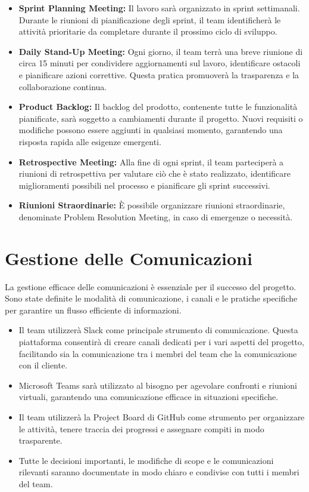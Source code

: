 \begin{itemize}
    \item \textbf{Sprint Planning Meeting:} Il lavoro sarà organizzato in sprint settimanali. Durante le riunioni di pianificazione degli sprint, il team identificherà le attività prioritarie da completare durante il prossimo ciclo di sviluppo.
    \item \textbf{Daily Stand-Up Meeting:} Ogni giorno, il team terrà una breve riunione di circa 15 minuti per condividere aggiornamenti sul lavoro, identificare ostacoli e pianificare azioni correttive. Questa pratica promuoverà la trasparenza e la collaborazione continua.
    \item \textbf{Product Backlog:} Il backlog del prodotto, contenente tutte le funzionalità pianificate, sarà soggetto a cambiamenti durante il progetto. Nuovi requisiti o modifiche possono essere aggiunti in qualsiasi momento, garantendo una risposta rapida alle esigenze emergenti.
    \item \textbf{Retrospective Meeting:} Alla fine di ogni sprint, il team parteciperà a riunioni di retrospettiva per valutare ciò che è stato realizzato, identificare miglioramenti possibili nel processo e pianificare gli sprint successivi.
    \item \textbf{Riunioni Straordinarie:} È possibile organizzare riunioni straordinarie, denominate Problem Resolution Meeting, in caso di emergenze o necessità.
\end{itemize}

\section{Gestione delle Comunicazioni}
La gestione efficace delle comunicazioni è essenziale per il successo del progetto. Sono state definite le modalità di comunicazione, i canali e le pratiche specifiche per garantire un flusso efficiente di informazioni.

\begin{itemize}
    \item Il team utilizzerà Slack come principale strumento di comunicazione. Questa piattaforma consentirà di creare canali dedicati per i vari aspetti del progetto, facilitando sia la comunicazione tra i membri del team che la comunicazione con il cliente.
    \item Microsoft Teams sarà utilizzato al bisogno per agevolare confronti e riunioni virtuali, garantendo una comunicazione efficace in situazioni specifiche.
    \item Il team utilizzerà la Project Board di GitHub come strumento per organizzare le attività, tenere traccia dei progressi e assegnare compiti in modo trasparente.
    \item Tutte le decisioni importanti, le modifiche di scope e le comunicazioni rilevanti saranno documentate in modo chiaro e condivise con tutti i membri del team.
\end{itemize}


